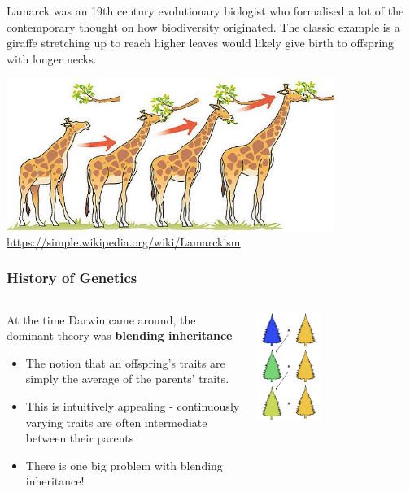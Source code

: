 \documentclass{beamer}
\begin{document}
\begin{frame}
{	Lamarck was an 19th century evolutionary biologist who formalised a lot of the contemporary thought on how biodiversity originated. The classic example is a giraffe stretching up to reach higher leaves would likely give birth to offspring with longer necks.
	
	\includegraphics[keepaspectratio, width  = 0.8\textwidth]{img/lamarck}\\
			\url{https://simple.wikipedia.org/wiki/Lamarckism}
}
\end{frame}



\begin{frame}
	\frametitle{History of Genetics}
	
	\begin{columns}[T]
		\begin{column}{.6\textwidth}
			At the time Darwin came around, the dominant theory was \textbf{blending inheritance}
		
			\vspace{5pt}
			\begin{itemize}
				\item The notion that an offspring's traits are simply the average of the parents' traits. 
				\item This is intuitively appealing -  continuously varying traits are often intermediate between their parents 
				\item There is one big problem with blending inheritance!
			\end{itemize}
		\end{column}
		\begin{column}{.3\textwidth}
				\centering
			\includegraphics[keepaspectratio, width  = 0.4\textwidth]{img/blending}
		\end{column}
	\end{columns}
	

\end{frame}
	
\end{document}
